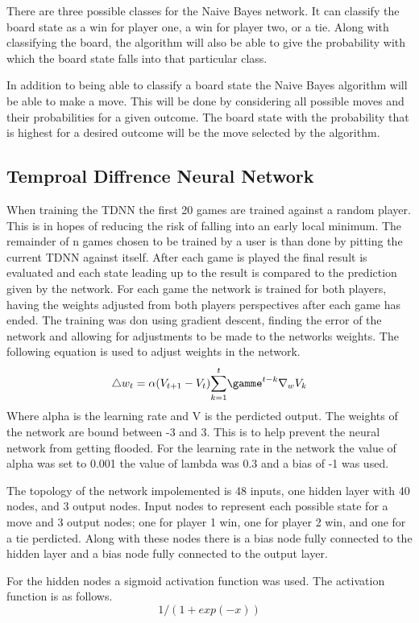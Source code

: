 \documentclass[12pt,letterpaper]{article}
\begin{document}
There are three possible classes for the Naive Bayes network. It can classify the board state as a win for player one, a win for player two, or a tie. Along with classifying the board, the algorithm will also be able to give the probability with which the board state falls into that particular class.

In addition to being able to classify a board state the Naive Bayes algorithm will be able to make a move. This will be done by considering all possible moves and their probabilities for a given outcome. The board state with the probability that is highest for a desired outcome will be the move selected by the algorithm. 

\subsection{Temproal Diffrence Neural Network}
When training the TDNN the first 20 games are trained against a random player. This is in hopes of reducing the risk of falling into an early local minimum. The remainder of n games chosen to be trained by a user is than done by pitting the current TDNN against itself. After each game is played the final result is evaluated and each state leading up to the result is compared to the prediction given by the network. For each game the network is trained for both players, having the weights adjusted from both players perspectives after each game has ended. The training was don using gradient descent, finding the error of the network and allowing for adjustments to be made to the networks weights. The following equation is used to adjust weights in the network. 
\[
{\triangle} w_t = \alpha (V _{t + 1} - V _t)  \overset{t}{\sum_{k = 1}} {\gamme}^{t - k} {\nabla}_w V_k
\]
Where alpha is the learning rate and V is the perdicted output. The weights of the network are bound between -3 and 3. This is to help prevent the neural network from getting flooded. For the learning rate in the network the value of alpha was set to 0.001 the value of lambda was 0.3 and a bias of -1 was used. 

The topology of the network impolemented is 48 inputs, one hidden layer with 40 nodes, and 3 output nodes. Input nodes to represent each possible state for a move and 3 output nodes; one for player 1 win, one for player 2 win, and one for a tie perdicted. Along with these nodes there is a bias node fully connected to the hidden layer and a bias node fully connected to the output layer. 

For the hidden nodes a sigmoid activation function was used. The activation function is as follows. 
\[
1 / (1+exp(-x))
\]
\end{document}
